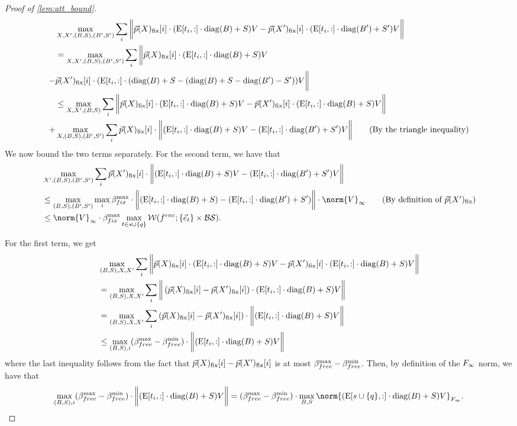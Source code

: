 \begin{proof}[Proof of \cref{lem:att_bound}]
	\begin{align*}
		&\max_{X, X', (B, S), (B', S')} \sum_i \bigg\|\vec{p}(X)_{\text{fix}}[i] \cdot (\text{E}[t_i, :] \cdot \mathrm{diag}(B) + S) V - \vec{p}(X')_{\text{fix}}[i] \cdot (\text{E}[t_i, :] \cdot \mathrm{diag}(B') + S') V\bigg\| \\
		&= \max_{X, X', (B, S), (B', S')} \sum_i \bigg\|\vec{p}(X)_{\text{fix}}[i] \cdot (\text{E}[t_i, :] \cdot \mathrm{diag}(B) + S) V \\
		-& \vec{p}(X')_{\text{fix}}[i] \cdot (\text{E}[t_i, :] \cdot (\mathrm{diag}(B) + S - (\mathrm{diag}(B) + S - \mathrm{diag}(B') - S')) V\bigg\| \\
		 &\leq \max_{X, X', (B, S)} \sum_i \bigg\|\vec{p}(X)_{\text{fix}}[i] \cdot (\text{E}[t_i, :] \cdot \mathrm{diag}(B) + S) V - \vec{p}(X')_{\text{fix}}[i] \cdot (\text{E}[t_i, :] \cdot \mathrm{diag}(B) + S) V\bigg\| \\
		+& \max_{X, (B, S), (B', S')} \sum_i \vec{p}(X)_{\text{fix}}[i] \cdot \bigg\| (\text{E}[t_i, :] \cdot \mathrm{diag}(B) + S) V - (\text{E}[t_i, :] \cdot \mathrm{diag}(B') + S') V\bigg\| \tag{By the triangle inequality}
	\end{align*}
	We now bound the two terms separately.
	For the second term, we have that
	\begin{align*}
		&\max_{X', (B, S), (B', S')} \sum_i \vec{p}(X')_\fix[i] \cdot \bigg\| (\Embed[t_i, :] \cdot \diag(B) + S) V - (\Embed[t_i, :] \cdot \diag(B') + S') V\bigg\| \\
		&\leq \max_{(B, S), (B', S')} \max_i \ssMaxRB \cdot \bigg\| (\Embed[t_i, :] \cdot \diag(B) + S) - (\Embed[t_i, :] \cdot \diag(B') + S')\bigg\| \cdot \norm{V}_\infty \tag{By definition of $\vec{p}(X')_\fix$} \\
		&\leq \norm{V}_\infty \cdot \ssMaxRB \max_{t \in s \cup \{q\}} \WD(\fenc; \{\vece_{t}\} \times \blowupSet \shiftSet).
	\end{align*}

	For the first term, we get
	\begin{align*}
		&\max_{(B, S), X, X'} \sum_i \bigg\|\vec{p}(X)_{\text{fix}}[i] \cdot (\text{E}[t_i, :] \cdot \mathrm{diag}(B) + S) V - \vec{p}(X')_{\text{fix}}[i] \cdot (\text{E}[t_i, :] \cdot \mathrm{diag}(B) + S) V\bigg\| \\	
		&= \max_{(B, S), X,X'} \sum_i \bigg\|\left(\vec{p}(X)_{\text{fix}}[i] - \vec{p}(X')_{\text{fix}}[i]\right) \cdot (\text{E}[t_i, :] \cdot \mathrm{diag}(B) + S) V \bigg\|\\
		&= \max_{(B, S), X, X'} \sum_i \left(\vec{p}(X)_{\text{fix}}[i] - \vec{p}(X')_{\text{fix}}[i]\right) \cdot \bigg\|(\text{E}[t_i, :] \cdot \mathrm{diag}(B) + S) V \bigg\|\\
		&\leq \max_{(B, S), i} ({\beta}_{free}^{\max} - {\beta}_{free}^{\min}) \cdot \bigg\|(\text{E}[t_i, :] \cdot \mathrm{diag}(B) + S) V \bigg\|
	\end{align*}
	where the last inequality follows from the fact that $\vec{p}(X)_{\text{fix}}[i] - \vec{p}(X')_{\text{fix}}[i]$ is at most ${\beta}_{free}^{\max} - {\beta}_{free}^{\min}$.
	Then, by definition of the ${F_{\infty}}$ norm, we have that
	\[
		\max_{(B, S), i} (\ssMaxFB - \ssMinFB) \cdot \bigg\|(\Embed[t_i, :] \cdot \diag(B) + S) V \bigg\| = (\ssMaxFB - \ssMinFB) \cdot \max_{B, S} \norm{(\Embed[s \cup \{q\}, :] \cdot \diag(B) + S) V}_\frobInf.
	\]


\end{proof}

